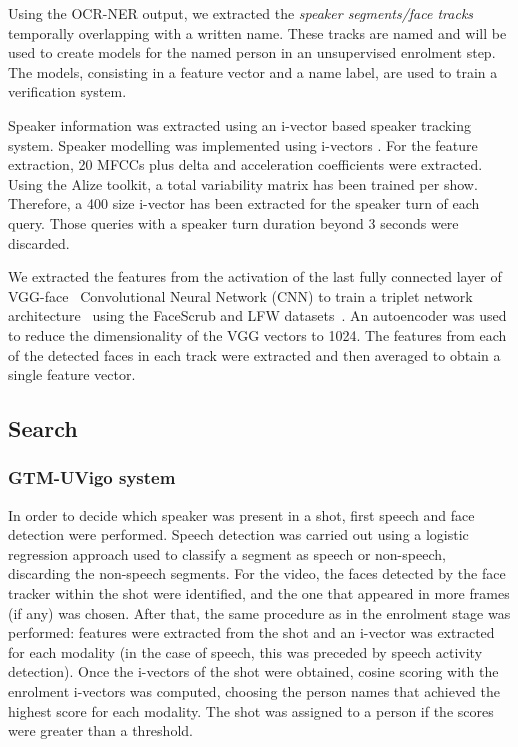 Using the OCR-NER output, we extracted the \textit{speaker segments/face tracks} temporally overlapping with a written name. These tracks are named 
and will be used to create models for the named person in an unsupervised enrolment step. The models, consisting in a feature vector and a name label, are used to train a verification system.

Speaker information was extracted using an i-vector based speaker tracking system. 
Speaker modelling was implemented using i-vectors \cite{dehak10}. For the feature extraction, 20 MFCCs plus delta and acceleration coefficients were extracted. Using the Alize toolkit\cite{Bonastre1}, a total variability matrix has been trained per show. Therefore, a 400 size i-vector has been extracted for the speaker turn of each query. Those queries with a speaker turn duration beyond 3 seconds were discarded.

We extracted the features from the activation of the last fully connected layer of VGG-face~\cite{parkhi15deep} Convolutional Neural Network (CNN) to train a triplet network architecture~\cite{Schroff2015} using the FaceScrub and LFW datasets~\cite{huang2007lfw,ng2014data}. An autoencoder was used to reduce the dimensionality of the VGG vectors to 1024. The features from each of the detected faces in each track were extracted and then averaged to obtain a single feature vector.

\subsection{Search}

\subsubsection{GTM-UVigo system}

In order to decide which speaker was present in a shot, first speech and face detection were performed. Speech detection was carried out using a logistic regression approach
used to classify a segment as speech or non-speech, discarding the non-speech segments. For the video, the faces detected by the face tracker within the shot were identified, 
and the one that appeared in more frames (if any) was chosen. After that, the same procedure as in the enrolment stage was performed: features were extracted from the shot
and an i-vector was extracted for each modality (in the case of speech, this was preceded by speech activity detection). Once the i-vectors of the shot were obtained,
cosine scoring with the enrolment i-vectors was computed, choosing the person names that achieved the highest score for each modality. The shot was assigned to
a person if 
the scores were greater than a threshold.

